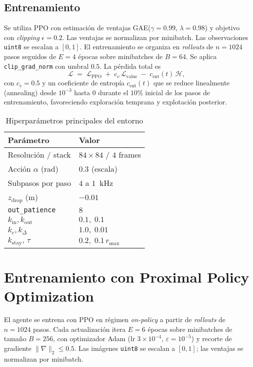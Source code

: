 \documentclass[conference]{IEEEtran}
\begin{document}
\subsection{Entrenamiento}
Se utiliza PPO \cite{Schulman2017PPO} con estimación de ventajas GAE($\gamma{=}0.99$, $\lambda{=}0.98$) y objetivo con \emph{clipping} $\epsilon{=}0.2$. Las ventajas se normalizan por minibatch. Las observaciones \texttt{uint8} se escalan a $[0,1]$. El entrenamiento se organiza en \emph{rollouts} de $n{=}1024$ pasos seguidos de $E{=}4$ épocas sobre minibatches de $B{=}64$. Se aplica \texttt{clip\_grad\_norm} con umbral $0.5$. La pérdida total es
\[
\mathcal{L} \;=\; \mathcal{L}_{\mathrm{PPO}} \;+\; c_v\,\mathcal{L}_{\mathrm{value}} \;-\; c_{\mathrm{ent}}(t)\,\mathcal{H},
\]
con $c_v{=}0.5$ y un coeficiente de entropía $c_{\mathrm{ent}}(t)$ que se reduce linealmente (annealing) desde $10^{-3}$ hasta $0$ durante el $10\%$ inicial de los pasos de entrenamiento, favoreciendo exploración temprana y explotación posterior.

\begin{table}[t]
\centering
\caption{Hiperparámetros principales del entorno}
\label{tab:env-hp}
\begin{tabular}{ll}
\hline
Parámetro & Valor \\
\hline
Resolución / stack & $84{\times}84$ / $4$ frames \\
Acción $\alpha$ (rad) & $0.3$ (escala) \\
Subpasos por paso & $4$ a $1$~kHz \\
$z_{\text{drop}}$ (m) & $-0.01$ \\
\texttt{out\_patience} & $8$ \\
$k_{\mathrm{in}},k_{\mathrm{out}}$ & $0.1,\;0.1$ \\
$k_c, k_{\Delta}$ & $1.0,\;0.01$ \\
$k_{\mathrm{stay}},\,\tau$ & $0.2,\;0.1\,r_{\max}$ \\
\hline
\end{tabular}
\end{table}
 


\section{Entrenamiento con Proximal Policy Optimization}
El agente se entrena con PPO en régimen \emph{on-policy} a partir de \emph{rollouts} de $n{=}1024$ pasos. Cada actualización itera $E{=}6$ épocas sobre mini\-batches de tamaño $B{=}256$, con optimizador Adam (lr $3\!\times\!10^{-4}$, $\varepsilon{=}10^{-5}$) y recorte de gradiente $\|\nabla\|_2\le 0.5$. Las imágenes \texttt{uint8} se escalan a $[0,1]$; las ventajas se normalizan por minibatch.
\end{document}
